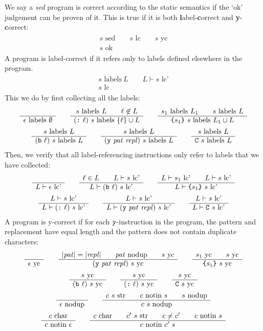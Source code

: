 \documentclass[11pt]{article}
\newcommand\RULE[2]{\begin{array}{c} #1 \\ \hline #2 \end{array}}
\newcommand\SED{\emph{sed}}
\newcommand\J[1]{\ensuremath{\text{ #1}}}
\newcommand\cmd[1]{\ensuremath{\text{\texttt{#1}}}}
\renewcommand\arg[1]{\ensuremath{\mathit{#1}}}
\begin{document}
We say a \SED{} program is correct according to the static semantics if the `ok' judgement can be proven of it.
This is true if it is both \textbf{l}abel-\textbf{c}orrect and \textbf{y}-\textbf{c}orrect:
\begin{gather*}
	\RULE{s \J{sed} \qquad s \J{lc} \qquad s \J{yc}}{s \J{ok}}
\end{gather*}
A program is label-correct if it refers only to labels defined elsewhere in the program.
\begin{gather*}
	\RULE{s \J{labels}\ L \qquad L \vdash s \J{lc'}}{s \J{lc}}
\end{gather*}
This we do by first collecting all the labels:
\begin{gather*}
	\RULE{}{\epsilon \J{labels}\ \emptyset} \qquad
	\RULE{s \J{labels}\ L \qquad \ell \not\in L}{(\cmd{:}\ \ell)\ s \J{labels}\ \{\ell\} \cup L} \qquad
	\RULE{s_1 \J{labels}\ L_1 \qquad s \J{labels}\ L}{\cmd{\{} s_1 \cmd{\}}\ s \J{labels}\ L_1 \cup L} \\
%
	\RULE{s \J{labels}\ L}{(\cmd{b}\ \ell)\ s \J{labels}\ L} \qquad
	\RULE{s \J{labels}\ L}{(\cmd{y}\ \arg{pat}\ \arg{repl})\ s \J{labels}\ L} \qquad
	\RULE{s \J{labels}\ L}{\cmd{C}\ s \J{labels}\ L}
\end{gather*}
Then, we verify that all label-referencing instructions only refer to labels that we have collected:
\begin{gather*}
	\RULE{}{L \vdash \epsilon \J{lc'}} \qquad
	\RULE{\ell \in L \qquad L \vdash s \J{lc'}}{L \vdash (\cmd{b}\ \ell)\ s \J{lc'}} \qquad
	\RULE{L \vdash s_1 \J{lc'} \qquad L \vdash s \J{lc'}}{L \vdash \cmd{\{} s_1 \cmd{\}}\ s \J{lc'}} \\
%
	\RULE{L \vdash s \J{lc'}}{L \vdash (\cmd{:}\ \ell)\ s \J{lc'}} \qquad
	\RULE{L \vdash s \J{lc'}}{L \vdash (\cmd{y}\ \arg{pat}\ \arg{repl})\ s \J{lc'}} \qquad
	\RULE{L \vdash s \J{lc'}}{L \vdash \cmd{C}\ s \J{lc'}}
\end{gather*}
A program is y-correct if for each \cmd{y}-instruction in the program, the pattern and replacement have equal length and the pattern does not contain duplicate characters:
\begin{gather*}
	\RULE{}{\epsilon \J{yc}} \qquad
	\RULE{|\arg{pat}| = |\arg{repl}| \qquad \arg{pat} \J{nodup} \qquad s \J{yc}}{(\cmd{y}\ \arg{pat}\ \arg{repl})\ s \J{yc}} \qquad
	\RULE{s_1 \J{yc} \qquad s \J{yc}}{\cmd{\{} s_1 \cmd{\}}\ s \J{yc}} \\
%
	\RULE{s \J{yc}}{(\cmd{b}\ \ell)\ s \J{yc}} \qquad
	\RULE{s \J{yc}}{(\cmd{:}\ \ell)\ s \J{yc}} \qquad
	\RULE{s \J{yc}}{\cmd{C}\ s \J{yc}} \\
	\RULE{}{\epsilon \J{nodup}} \qquad
	\RULE{c\ s \J{str} \qquad c \J{notin}\ s \qquad s \J{nodup}}{c\ s \J{nodup}} \\
	\RULE{c \J{char}}{c \J{notin}\ \epsilon} \qquad
	\RULE{c \J{char} \qquad c'\ s \J{str} \qquad c \not= c' \qquad c \J{notin}\ s}{c \J{notin}\ c'\ s}
\end{gather*}
\end{document}
